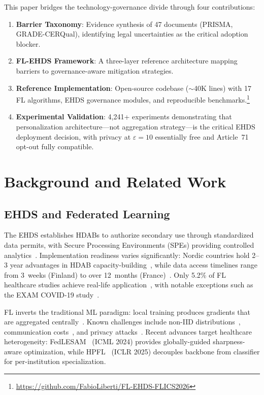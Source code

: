 \documentclass[conference,letterpaper]{IEEEtran}
\begin{document}
This paper bridges the technology-governance divide through four contributions:
\begin{enumerate}
    \item \textbf{Barrier Taxonomy}: Evidence synthesis of 47 documents (PRISMA, GRADE-CERQual), identifying legal uncertainties as the critical adoption blocker.
    \item \textbf{FL-EHDS Framework}: A three-layer reference architecture mapping barriers to governance-aware mitigation strategies.
    \item \textbf{Reference Implementation}: Open-source codebase ($\sim$40K lines) with 17 FL algorithms, EHDS governance modules, and reproducible benchmarks.\footnote{\url{https://github.com/FabioLiberti/FL-EHDS-FLICS2026}}
    \item \textbf{Experimental Validation}: 4,241+ experiments demonstrating that personalization architecture---not aggregation strategy---is the critical EHDS deployment decision, with privacy at $\varepsilon{=}10$ essentially free and Article~71 opt-out fully compatible.
\end{enumerate}

\section{Background and Related Work}
\label{sec:background}

\subsection{EHDS and Federated Learning}

The EHDS establishes HDABs to authorize secondary use through standardized data permits, with Secure Processing Environments (SPEs) providing controlled analytics~\cite{svingel2025hdab}. Implementation readiness varies significantly: Nordic countries hold 2--3 year advantages in HDAB capacity-building~\cite{tehdas2024ready}, while data access timelines range from 3~weeks (Finland) to over 12~months (France)~\cite{forster2025journeys}. Only 5.2\% of FL healthcare studies achieve real-life application~\cite{teo2024systematic}, with notable exceptions such as the EXAM COVID-19 study~\cite{dayan2021federated}.

FL inverts the traditional ML paradigm: local training produces gradients that are aggregated centrally~\cite{mcmahan2017communication}. Known challenges include non-IID distributions~\cite{li2020federated}, communication costs~\cite{bonawitz2019scale}, and privacy attacks~\cite{zhu2019deep, shokri2017membership}. Recent advances target healthcare heterogeneity: FedLESAM~\cite{qu2024fedlesam} (ICML 2024) provides globally-guided sharpness-aware optimization, while HPFL~\cite{chen2025hpfl} (ICLR 2025) decouples backbone from classifier for per-institution specialization.
\end{document}

